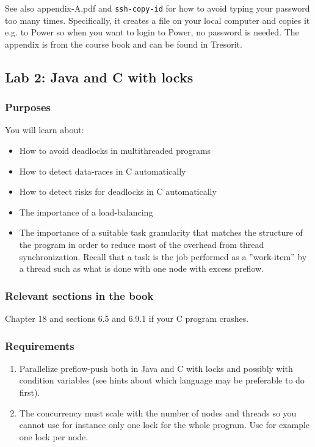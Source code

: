 \documentclass{forsete}
\begin{document}
{See also appendix-A.pdf and \verb!ssh-copy-id! for how to avoid typing your password too many times. Specifically, it creates a file on your local computer and copies it e.g. to Power so when you want to login to Power, no password is needed. The appendix is from the course book and can be found in Tresorit.


\newpage
\subsection*{Lab 2: Java and C with locks}
\subsubsection*{Purposes}
You will learn about:
\begin{itemize}
\item How to avoid deadlocks in multithreaded programs
\item How to detect data-races in C automatically
\item How to detect risks for deadlocks in C automatically
\item The importance of a load-balancing
\item The importance of a suitable task granularity
that
matches the structure of the program in order to reduce most of the overhead from
thread synchronization.
Recall that a task is  the job performed as a ''work-item''
by a thread such as what is done with one node with excess preflow.
\end{itemize}

\subsubsection*{Relevant sections in the book}
Chapter 18 and sections 6.5 and 6.9.1 if your C program crashes.
\subsubsection*{Requirements}
\begin{enumerate}
\item Parallelize preflow-push both in Java and C with locks and possibly with
condition variables (see hints about which language may be preferable to do first).

\item The concurrency must scale with the number of nodes and threads so you cannot use for instance
only one lock for the whole program. Use for example one lock per node.


\end{enumerate}}
\end{document}
